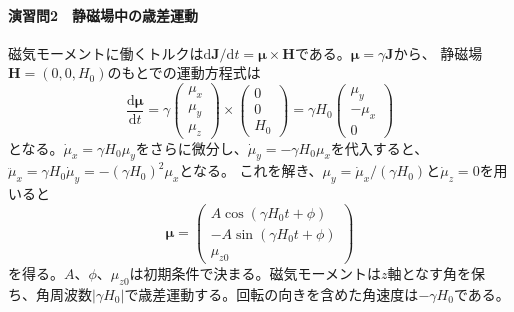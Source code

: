 \documentclass[dvipdfmx,a4paper,11pt]{jsarticle}
\begin{document}
\paragraph{演習問2　静磁場中の歳差運動}
磁気モーメントに働くトルクは$\mathrm{d}\boldsymbol{J}/\mathrm{d}t
=\boldsymbol{\mu}\times\boldsymbol{H}$である。$\boldsymbol{\mu}=\gamma\boldsymbol{J}$から、
静磁場$\boldsymbol{H}=(0,0,H_0)$のもとでの運動方程式は
\begin{equation}
  \frac{\mathrm{d}\boldsymbol{\mu}}{\mathrm{d}t}
   =\gamma
   \begin{pmatrix}\mu_x\\\mu_y\\\mu_z\end{pmatrix}
   \times\begin{pmatrix}0\\0\\H_0\end{pmatrix}
   =\gamma H_0\begin{pmatrix}\mu_y\\-\mu_x\\0\end{pmatrix}
\end{equation}
となる。$\dot{\mu}_x=\gamma H_0\mu_y$をさらに微分し、$\dot{\mu}_y=-\gamma H_0\mu_x$を代入すると、
$\ddot{\mu}_x=\gamma H_0\dot{\mu}_y=-(\gamma H_0)^2\mu_x$となる。
これを解き、$\mu_y=\dot{\mu}_x/(\gamma H_0)$と$\dot{\mu}_z=0$を用いると
\begin{equation}
  \boldsymbol{\mu}=
  \begin{pmatrix}
   A\cos(\gamma H_0 t+\phi)\\
   -A\sin(\gamma H_0 t+\phi)\\
   \mu_{z0}
  \end{pmatrix}
\end{equation}
を得る。$A$、$\phi$、$\mu_{z0}$は初期条件で決まる。磁気モーメントは$z$軸となす角を保ち、角周波数$|\gamma H_0|$で歳差運動する。回転の向きを含めた角速度は$-\gamma H_0$である。
\end{document}
